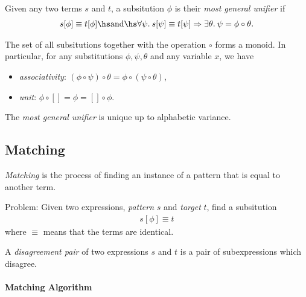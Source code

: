 \documentclass{article}
\begin{document}
\begin{definition}
	Given any two terms $s$ and $t$, a subsitution $\phi$ is their \emph{most general unifier}
	if
	\begin{align*}
		s[\phi]\equiv t[\phi] \hs\text{and}\hs
		\forall \psi.\: s[\psi] \equiv t[\psi]  \Rightarrow \exists \theta.\: \psi = \phi \circ \theta.
	\end{align*}
\end{definition}

\begin{theorem}
	The set of all subsitutions together with the operation $\circ$ forms a monoid. In particular,
	for any substitutions $\phi,\psi,\theta$ and any variable $x$, we have
	\begin{itemize}
		\item \emph{associativity}: $(\phi \circ \psi) \circ \theta = \phi \circ (\psi \circ \theta)$,
		\item \emph{unit}: $\phi\circ[] = \phi = []\circ\phi$.
	\end{itemize}
\end{theorem}

\begin{theorem}
	The \emph{most general unifier} is unique up to alphabetic variance.
\end{theorem}

\subsection{Matching}

\begin{definition}
	\emph{Matching} is the process of finding an instance of a pattern that is equal to another term.

	Problem: Given two expressions, \emph{pattern} $s$ and \emph{target} $t$, find a subsitution
	\begin{align*}
		s[\phi] \equiv t
	\end{align*}
	where $\equiv$ means that the terms are identical.
\end{definition}

\begin{definition}
	A \emph{disagreement pair} of two expressions $s$ and $t$ is a pair of subexpressions
	which disagree.
\end{definition}

\paragraph{Matching Algorithm}
\end{document}
